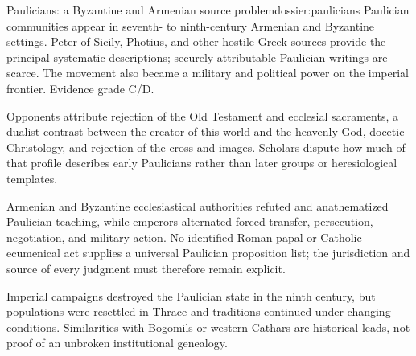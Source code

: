\begin{heresydossier}{Paulicians: a Byzantine and Armenian source problem}{dossier:paulicians}
\objectfield Paulician communities appear in seventh- to ninth-century Armenian and Byzantine settings. Peter of Sicily, Photius, and other hostile Greek sources provide the principal systematic descriptions; securely attributable Paulician writings are scarce. The movement also became a military and political power on the imperial frontier. Evidence grade C/D.

\propositionfield Opponents attribute rejection of the Old Testament and ecclesial sacraments, a dualist contrast between the creator of this world and the heavenly God, docetic Christology, and rejection of the cross and images. Scholars dispute how much of that profile describes early Paulicians rather than later groups or heresiological templates.

\responsefield Armenian and Byzantine ecclesiastical authorities refuted and anathematized Paulician teaching, while emperors alternated forced transfer, persecution, negotiation, and military action. No identified Roman papal or Catholic ecumenical act supplies a universal Paulician proposition list; the jurisdiction and source of every judgment must therefore remain explicit.

\aftermathfield Imperial campaigns destroyed the Paulician state in the ninth century, but populations were resettled in Thrace and traditions continued under changing conditions. Similarities with Bogomils or western Cathars are historical leads, not proof of an unbroken institutional genealogy.
\end{heresydossier}

